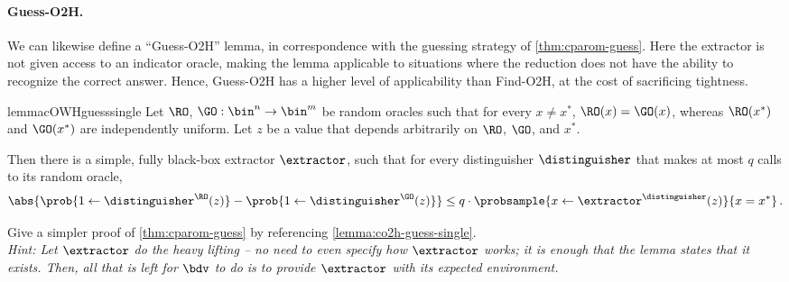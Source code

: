  \paragraph{Guess-O2H.}
    We can likewise define a ``Guess-O2H'' lemma, in correspondence with the guessing
      strategy of \cref{thm:cparom-guess}. Here the extractor is not given
      access to an indicator oracle, making the lemma applicable to situations
      where the reduction does not have the ability to recognize the correct
      answer. Hence, Guess-O2H has a higher level of applicability than Find-O2H, at the
      cost of sacrificing tightness.

    \begin{restatable}{lemma}{cOWHguesssingle}\label{lemma:co2h-guess-single}
      Let $\RO$, $\GO: \bin^n \to \bin^m$ be random
      oracles such that for every $x \neq x^*$, $\RO(x) = \GO(x)$, whereas
      $\RO(x^*)$ and $\GO(x^*)$ are independently uniform. 
      Let $z$ be a value that depends arbitrarily on $\RO$, $\GO$, and $x^*$.

      Then there is a simple, fully black-box extractor $\extractor$,
      such that for every distinguisher $\distinguisher$ that makes at most $q$
      calls to its random oracle,
      \[
          \abs{\prob{1 \gets \distinguisher^{\RO}(z)}
              - \prob{1 \gets \distinguisher^{\GO}(z)}}
            \leq q \cdot \probsample{x \gets \extractor^{\distinguisher}(z)}{x = x^*}\, .
      \]
    \end{restatable}

    \begin{exercise}\label{ex:cparom-lossy}
      Give a simpler proof of \cref{thm:cparom-guess} by
      referencing \cref{lemma:co2h-guess-single}. \\
      \emph{
        Hint: Let $\extractor$ do the heavy lifting -- no need to even specify
        how $\extractor$ works; it is enough that the lemma states that it
        exists. Then, all that is left for $\bdv$ to do is to provide $\extractor$ with its
        expected environment.
      }
    \end{exercise}


